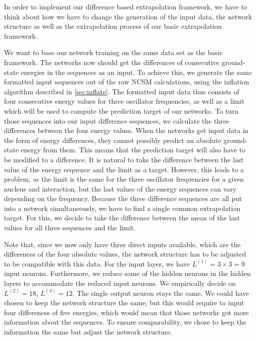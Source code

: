 In order to implement our difference based extrapolation framework, we have to think about how we have to change the generation of the input data, the network structure as well as the extrapolation process of our basic extrapolation framework.

We want to base our network training on the same data set as the basic framework. The networks now should get the differences of consecutive ground-state energies in the sequences as an input. To achieve this, we generate the same formatted input sequences out of the raw NCSM calculations, using the inflation algorithm described in \autoref{sec:inflate}. The formatted input data thus consists of four consecutive energy values for three oscillator frequencies, as well as a limit which will be used to compute the prediction target of our networks. To turn those sequences into our input difference sequences, we calculate the three differences between the four energy values. When the networks get input data in the form of energy differences, they cannot possibly predict an absolute ground-state energy from them. This means that the prediction target will also have to be modified to a difference. It is natural to take the difference between the last value of the energy sequence and the limit as a target. However, this leads to a problem, as the limit is the same for the three oscillator frequencies for a given nucleus and interaction, but the last values of the energy sequences can vary depending on the frequency. Because the three difference sequences are all put into a network simultaneously, we have to find a single common extrapolation target. For this, we decide to take the difference between the mean of the last values for all three sequences and the limit.

Note that, since we now only have three direct inputs available, which are the differences of the four absolute values, the network structure has to be adjusted to be compatible with this data. For the input layer, we have $L^{(1)} = 3 \times 3 = 9$ input neurons. Furthermore, we reduce some of the hidden neurons in the hidden layers to accommodate the reduced input neurons. We empirically decide on $L^{(2)} = 18$, $L^{(3)} = 12$. The single output neuron stays the same. We could have chosen to keep the network structure the same, but this would require to input four differences of five energies, which would mean that those networks got more information about the sequences. To ensure comparability, we chose to keep the information the same but adjust the network structure.

